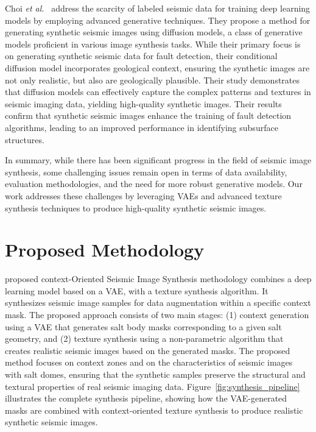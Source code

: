 ﻿\documentclass{ieeeaccess}
\begin{document}
Choi \emph{et al.}~\cite{Choi2025} address the scarcity of labeled seismic data for training deep learning models by employing advanced generative techniques. They propose a method for generating synthetic seismic images using diffusion models, a class of generative models proficient in various image synthesis tasks. While their primary focus is on generating synthetic seismic data for fault detection, their conditional diffusion model incorporates geological context, ensuring the synthetic images are not only realistic, but also are geologically plausible. Their study demonstrates that diffusion models can effectively capture the complex patterns and textures in seismic imaging data, yielding high-quality synthetic images. Their results confirm that synthetic seismic images enhance the training of fault detection algorithms, leading to an improved performance in identifying subsurface structures.

In summary, while there has been significant progress in the field of seismic image synthesis, some challenging issues  remain open in terms of data availability, evaluation methodologies, and the need for more robust generative models. Our work addresses these challenges by leveraging VAEs and advanced texture synthesis techniques to produce high-quality synthetic seismic images.



\section{Proposed Methodology}
\label{sec:methodology}


 proposed context-Oriented Seismic Image Synthesis methodology combines a deep learning model based on a VAE, with a texture synthesis algorithm. It synthesizes seismic image samples for data augmentation within a specific context mask. The proposed approach consists of two main stages: (1) context generation using a VAE that generates salt body masks corresponding to a given salt geometry, and (2) texture synthesis using a non-parametric algorithm that creates realistic seismic images based on the generated masks. The proposed method focuses on context zones and on the characteristics of seismic images with salt domes, ensuring that the synthetic samples preserve the structural and textural properties of real seismic imaging data. Figure~\ref{fig:synthesis_pipeline} illustrates the complete synthesis pipeline, showing how the VAE-generated masks are combined with context-oriented texture synthesis to produce realistic synthetic seismic images.
\end{document}
